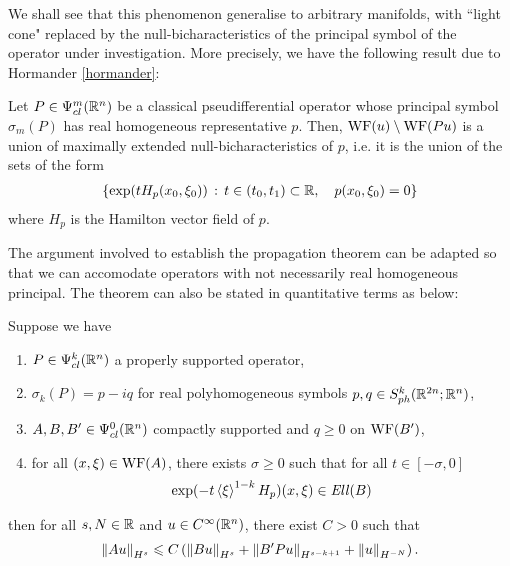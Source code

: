 \documentclass[12pt]{article}
\begin{document}
 We shall see that this phenomenon generalise to arbitrary manifolds, with ``light cone" replaced by the null-bicharacteristics of the principal symbol of the operator under investigation. More precisely, we have the following result due to Hormander \ref{hormander}: 
 \begin{ftheorem}
Let $P \in \Psi^{m}_{cl}(\R^n)$ be a classical pseudifferential operator whose principal symbol $\sigma_m(P)$ has real homogeneous representative $p$. Then, $\WF(u) \setminus \WF(Pu) $ is a union of maximally extended null-bicharacteristics of $p$, i.e. it is the union of the sets of the form
\begin{align*}
\set{\exp(t H_p(x_0, \xi_0)) \wh t \in (t_0, t_1)\subset \R, \quad p(x_0, \xi_0) = 0}
\end{align*}
where $H_p$ is the Hamilton vector field of $p$. 
\end{ftheorem}

The argument involved to establish the propagation theorem can be adapted so that we can accomodate operators with not necessarily real homogeneous principal. The theorem can also be stated in quantitative terms as below: 



\begin{ftheorem} 
    Suppose we have 
    \begin{enumerate}
        \item $P \in \Psi^k_{cl}(\R^n)$ a properly supported operator,
        \item $\sigma_{k}(P) = p - iq$ for real polyhomogeneous symbols $p, q \in S^{k}_{ph}(\R^{2n}; \R^{n})$, 
        \item $A, B, B' \in \Psi^{0}_{cl}(\R^n)$ compactly supported and $q \geq 0 $ on $\WF(B')$, 
        \item for all $(x, \xi) \in \WF(A)$, there exists $\sigma \geq 0$ such that for all $t \in [-\sigma, 0]$
        \begin{align*}
            \exp(-t\sym[\xi]^{1-k}H_p)(x, \xi) \in \Ell(B)
        \end{align*}
    \end{enumerate}
    then for all $s, N \in \R$ and $u \in C^\infty(\R^n)$, there exist $C > 0$ such that 
    \begin{align*}
        \norm[Au]_{H^s} \leq C\brac{\norm[Bu]_{H^s} + \norm[B'Pu]_{H^{s - k + 1}} + \norm[u]_{H^{-N}}}. 
    \end{align*}
\end{ftheorem}
\end{document}
